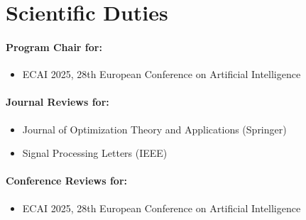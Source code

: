 \section{Scientific Duties}

\paragraph{Program Chair for:}
\begin{itemize}
    \item ECAI 2025, 28th European Conference on Artificial Intelligence
\end{itemize}

\paragraph{Journal Reviews for:}
\begin{itemize}
    \item Journal of Optimization Theory and Applications (Springer)
    \item Signal Processing Letters (IEEE)
\end{itemize}

\paragraph{Conference Reviews for:}
\begin{itemize}
    \item ECAI 2025, 28th European Conference on Artificial Intelligence
\end{itemize}